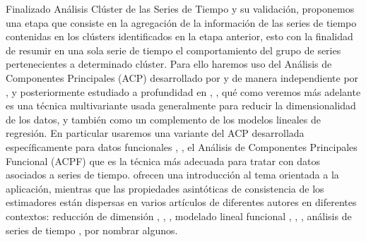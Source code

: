 \documentclass[12pt,oneside]{book}\usepackage[]{graphicx}\usepackage[]{color}
\theoremstyle{definition} %
\begin{document}
Finalizado Análisis Clúster de las Series de Tiempo y su validación, proponemos una etapa que consiste en la agregación de la información de las series de tiempo contenidas en los clústers identificados en la etapa anterior, esto con la finalidad de resumir en una sola serie de tiempo el comportamiento del grupo de series pertenecientes a determinado clúster.
Para ello haremos uso del Análisis de Componentes Principales (ACP) desarrollado por \citeauthor{pearson1901liii} \citeyear{pearson1901liii} y de manera independiente por \citeauthor{hotelling1933analysis} \citeyear{hotelling1933analysis}, y posteriormente estudiado a profundidad en  \citeauthor{anderson2003multivariate}\citeyear{anderson2003multivariate}, \citeauthor{jolliffe2011principal}\citeyear{jolliffe2011principal}, qué como veremos más adelante es una técnica multivariante usada generalmente para reducir la dimensionalidad de los datos, y también como un complemento de los modelos lineales de regresión.
En particular usaremos una variante del ACP desarrollada específicamente para datos funcionales \citeauthor{rao1958some}\citeyear{rao1958some}, \citeauthor{tucker1958determination}\citeyear{tucker1958determination}, el Análisis de Componentes Principales Funcional (ACPF) que es la técnica más adecuada para tratar con datos asociados a series de tiempo. 
  \citeauthor{ramsey1997functional}  \citeyear{ramsey1997functional} ofrecen una introducción al tema orientada a la aplicación, mientras que las propiedades asintóticas de consistencia de los estimadores están dispersas en varios artículos de diferentes autores en diferentes contextos: reducción de dimensión  \citeauthor{dauxois1982asymptotic}\citeyear{dauxois1982asymptotic}, \citeauthor{hall2006properties}\citeyear{hall2006properties}, \citeauthor{hall2009theory}\citeyear{hall2009theory}, modelado lineal funcional \citeauthor{cardot1999functional}\citeyear{cardot1999functional}, \citeauthor{cardot2003spline}\citeyear{cardot2003spline}, \citeauthor{hall2007methodology}\citeyear{hall2007methodology}, análisis de series de tiempo \citeauthor{bosq2012linear}\citeyear{bosq2012linear}, por nombrar algunos. 






\end{document}
